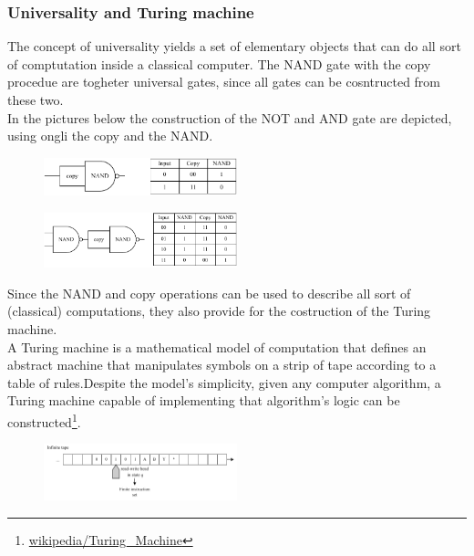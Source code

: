\subsubsection{Universality and Turing machine}
The concept of universality yields a set of elementary objects that can do all sort of comptutation inside a classical computer. The NAND gate with the copy procedue are togheter universal gates, since all gates can be cosntructed from these two. \\
In the pictures below the construction of the NOT and AND gate are depicted, using ongli the copy and the NAND. 
\begin{figure}[h]
 		\centering
		\includegraphics[width=0.5\textwidth]{universal_not.pdf}
	\end{figure}
\begin{figure}[h]
 		\centering
		\includegraphics[width=0.5\textwidth]{universal_and.pdf}
	\end{figure}
	
Since the NAND and copy operations can be used to describe all sort of (classical) computations, they also provide for the costruction of the Turing machine. \\
A Turing machine is a mathematical model of computation that defines an abstract machine that manipulates symbols on a strip of tape according to a table of rules.Despite the model's simplicity, given any computer algorithm, a Turing machine capable of implementing that algorithm's logic can be constructed\footnote{\href{https://en.wikipedia.org/wiki/Turing_machine}{wikipedia/Turing\_Machine}}.\\
\begin{figure}[h]
 		\centering
		\includegraphics[width=0.5\textwidth]{turing.pdf}
	\end{figure}
	
